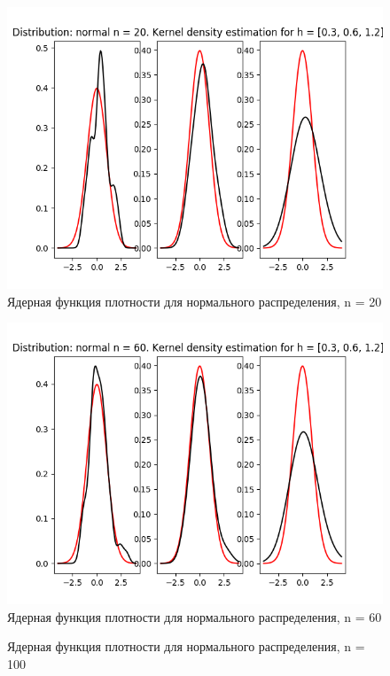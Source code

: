 \documentclass[12pt]{report}
\begin{document}
\begin{center}
    \begin{figure}[H]
 \caption{Ядерная функция плотности для нормального распределения, n = 20}
\includegraphics[width=\textwidth]{../lab_4/pic/kernel/d_normal20.png}
\end{figure}
    \begin{figure}[H]
 \caption{Ядерная функция плотности для нормального распределения, n = 60}
\includegraphics[width=\textwidth]{../lab_4/pic/kernel/d_normal60.png}
\end{figure}
    \begin{figure}[H]
 \caption{Ядерная функция плотности для нормального распределения, n = 100}

\end{figure}
\end{center}
\end{document}
